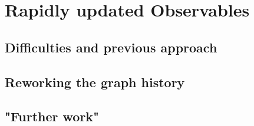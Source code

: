 \section{Rapidly updated Observables}
	
	\subsection{Difficulties and previous approach}
	
	\subsection{Reworking the graph history}
	
	
	\subsection{"Further work"}

